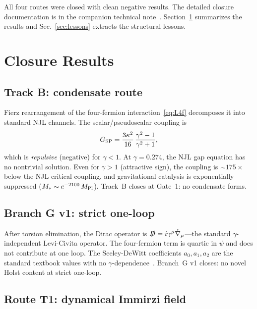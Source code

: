 \documentclass[aps,prd,twocolumn,superscriptaddress,showpacs,preprintnumbers,
  nofootinbib,longbibliography,floatfix]{revtex4-2}
\newcommand{\MPl}{M_{\rm Pl}}
\newcommand{\BI}{\gamma}
\newcommand{\Gsp}{G_{\rm SP}}
\begin{document}
All four routes were closed with clean negative results. The detailed
closure documentation is in the companion technical
note~\cite{Golden2026supplement}. Section~\ref{sec:closures} summarizes
the results and Sec.~\ref{sec:lessons} extracts the structural lessons.


\section{Closure Results}\label{sec:closures}

\subsection{Track B: condensate route}\label{sec:trackB}

Fierz rearrangement of the four-fermion
interaction~\eqref{eq:L4f} decomposes it into standard NJL channels.
The scalar/pseudoscalar coupling is
\begin{equation}\label{eq:GSP}
  \Gsp = \frac{3\kappa^2}{16}\,\frac{\BI^2 - 1}{\BI^2 + 1},
\end{equation}
which is \textit{repulsive} (negative) for $\BI < 1$. At $\BI = 0.274$,
the NJL gap equation has no nontrivial solution. Even for $\BI > 1$
(attractive sign), the coupling is $\sim\!175\times$ below the NJL
critical coupling, and gravitational catalysis is exponentially
suppressed ($M_* \sim e^{-2100}\,\MPl$). Track~B closes at Gate~1:
no condensate forms.

\subsection{Branch G v1: strict one-loop}\label{sec:branchG}

After torsion elimination, the Dirac operator is
$\slashed{D} = i\gamma^\mu\mathring\nabla_\mu$---the standard
$\BI$-independent Levi-Civita operator. The four-fermion term is quartic
in $\psi$ and does not contribute at one loop. The Seeley-DeWitt
coefficients $a_0, a_1, a_2$ are the standard textbook values with no
$\BI$-dependence~\cite{Vassilevich2003}. Branch~G v1 closes: no novel
Holst content at strict one-loop.

\subsection{Route T1: dynamical Immirzi field}\label{sec:T1}
\end{document}
